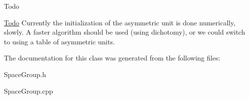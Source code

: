 \begin{DoxyRefDesc}{Todo}
\item[\mbox{\hyperlink{todo__todo000013}{Todo}}]Currently the initialization of the asymmetric unit is done numerically, slowly. A faster algorithm should be used (using dichotomy), or we could switch to using a table of asymmetric units. \end{DoxyRefDesc}


The documentation for this class was generated from the following files\+:\begin{DoxyCompactItemize}
\item 
Space\+Group.\+h\item 
Space\+Group.\+cpp\end{DoxyCompactItemize}
